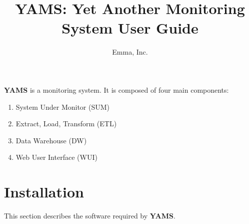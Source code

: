 \documentclass[a4paper,twoside,12pt]{article}
\title{YAMS: Yet Another Monitoring System User Guide}
\author{Emma, Inc.}
\date{}
\begin{document}
\maketitle

\textbf{YAMS} is a monitoring system.  It is composed of four main components:
\begin{enumerate}
  \item System Under Monitor (SUM)
  \item Extract, Load, Transform (ETL)
  \item Data Warehouse (DW)
  \item Web User Interface (WUI)
\end{enumerate}

\section{Installation}

This section describes the software required by \textbf{YAMS}.
\end{document}

